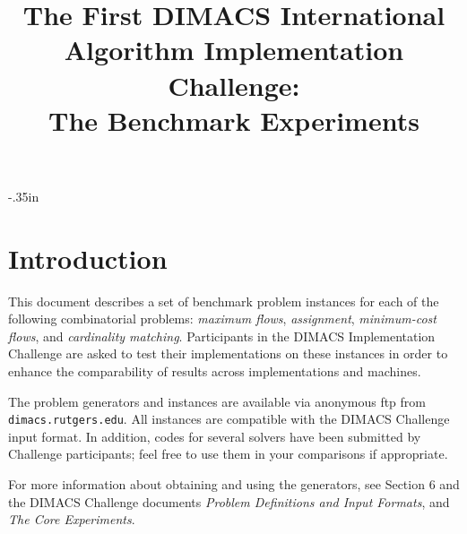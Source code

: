 \oddsidemargin-.35in
\textwidth 18cm
\topmargin -1.123in
\textheight 24cm
\baselineskip 20pt



\title{  The First DIMACS International \\
Algorithm Implementation Challenge: \\
The Benchmark Experiments} 

\author{}
\maketitle

\section{Introduction}

This document describes a set of benchmark problem instances for 
each of the following combinatorial problems: {\em maximum flows},
{\em assignment}, {\em minimum-cost flows}, and {\em cardinality matching}. 
Participants in the DIMACS
Implementation Challenge are asked to test their implementations on 
these instances in order to enhance the comparability of results 
across implementations and machines.  

The problem generators and instances are available
via anonymous ftp from {\tt dimacs.rutgers.edu}.   
All instances are compatible with the DIMACS Challenge input format. 
In addition, codes for several solvers have been submitted by 
Challenge participants;  feel free to use them in your 
comparisons if appropriate. 

For more information about obtaining and using 
the generators, see Section 6 and the DIMACS Challenge 
documents  {\em Problem Definitions and Input Formats}, and 
{\em The Core Experiments}. 

